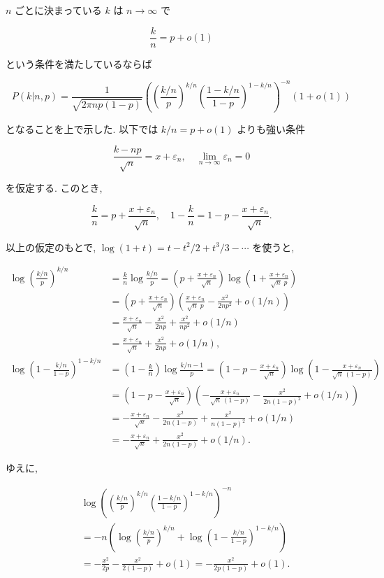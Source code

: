 \documentclass[
  letterpaper,
  DIV=11,
  numbers=noendperiod]{scrartcl}
\begin{document}
\(n\) ごとに決まっている \(k\) は \(n\to\infty\) で

\[
\frac{k}{n} = p + o(1)
\]

という条件を満たしているならば

\[
P(k|n,p) =
\frac{1}{\sqrt{2\pi np(1-p)}}
\left(\left(\frac{k/n}{p}\right)^{k/n}\left(\frac{1-k/n}{1-p}\right)^{1-k/n}\right)^{-n}
(1 + o(1))
\]

となることを上で示した. 以下では \(k/n = p + o(1)\) よりも強い条件

\[
\frac{k - np}{\sqrt{n}} = x + \varepsilon_n, \quad
\lim_{n\to\infty}\varepsilon_n = 0
\]

を仮定する. このとき,

\[
\frac{k}{n} = p + \frac{x+\varepsilon_n}{\sqrt{n}}, \quad
1-\frac{k}{n} = 1 - p - \frac{x+\varepsilon_n}{\sqrt{n}}.
\]

以上の仮定のもとで, \(\log(1+t)=t-t^2/2+t^3/3-\cdots\) を使うと,

\[
\begin{aligned}
\log\left(\frac{k/n}{p}\right)^{k/n} &=
\frac{k}{n}\log\frac{k/n}{p} =
\left(p + \frac{x+\varepsilon_n}{\sqrt{n}}\right)
\log\left(1 + \frac{x+\varepsilon_n}{\sqrt{n}\;p}\right)
\\ &=
\left(p + \frac{x+\varepsilon_n}{\sqrt{n}}\right)
\left(\frac{x+\varepsilon_n}{\sqrt{n}\;p} - \frac{x^2}{2np^2} + o(1/n)\right)
\\ &=
\frac{x+\varepsilon_n}{\sqrt{n}} - \frac{x^2}{2np} + \frac{x^2}{np^2} + o(1/n)
\\ &=
\frac{x+\varepsilon_n}{\sqrt{n}} + \frac{x^2}{2np} + o(1/n),
\\
\log\left(1-\frac{k/n}{1-p}\right)^{1-k/n} &=
\left(1-\frac{k}{n}\right)\log\frac{k/n-1}{p} =
\left(1 - p - \frac{x+\varepsilon_n}{\sqrt{n}}\right)
\log\left(1 - \frac{x+\varepsilon_n}{\sqrt{n}\,(1-p)}\right)
\\ &=
\left(1 - p - \frac{x+\varepsilon_n}{\sqrt{n}}\right)
\left(-\frac{x+\varepsilon_n}{\sqrt{n}\,(1-p)} - \frac{x^2}{2n(1-p)^2} + o(1/n)\right)
\\ &= -
\frac{x+\varepsilon_n}{\sqrt{n}} - \frac{x^2}{2n(1-p)} + \frac{x^2}{n(1-p)^2} + o(1/n)
\\ &= -
\frac{x+\varepsilon_n}{\sqrt{n}} + \frac{x^2}{2n(1-p)} + o(1/n).
\end{aligned}
\]

ゆえに,

\[
\begin{aligned}
&
\log\left(\left(\frac{k/n}{p}\right)^{k/n}\left(\frac{1-k/n}{1-p}\right)^{1-k/n}\right)^{-n}
\\ &=
-n\left(
\log\left(\frac{k/n}{p}\right)^{k/n} +
\log\left(1-\frac{k/n}{1-p}\right)^{1-k/n}
\right)
\\ &= -
\frac{x^2}{2p} - \frac{x^2}{2(1-p)} + o(1) = -
\frac{x^2}{2p(1-p)} + o(1).
\end{aligned}
\]
\end{document}
